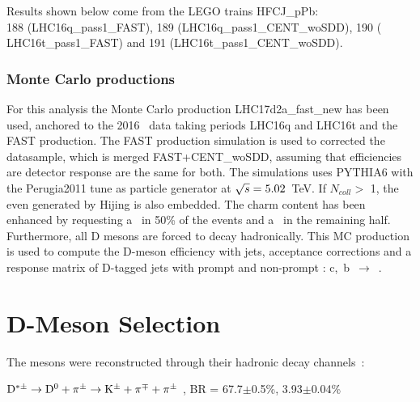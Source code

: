 Results shown below come from the LEGO trains HFCJ\_pPb: \\188 (LHC16q\_pass1\_FAST), 189 (LHC16q\_pass1\_CENT\_woSDD), 190 ( LHC16t\_pass1\_FAST) and 191 (LHC16t\_pass1\_CENT\_woSDD).

\subsubsection{Monte Carlo productions}

For this analysis the Monte Carlo production LHC17d2a\_fast\_new has been used, anchored to the 2016 \pPb\ data taking periods LHC16q and LHC16t and the FAST production. The FAST production simulation is used to corrected the datasample, which is merged FAST+CENT\_woSDD, assuming that efficiencies are detector response are the same for both.
The simulations uses PYTHIA6 with the Perugia2011 tune as particle generator at $\sqrt{s}=5.02$~TeV. If $N_{coll} > $ 1, the even generated by Hijing is also embedded.
The charm content has been enhanced by requesting a \ccbar\ in 50\% of the events and a \bbbar\ in the remaining half.
Furthermore, all D mesons are forced to decay hadronically.
This MC production is used to compute the D-meson efficiency with jets, acceptance corrections and a response matrix of D-tagged jets with prompt and non-prompt \Dstar: c,~b~$\rightarrow$~\Dstar.




\section{D-Meson Selection}
The \Dstar mesons were reconstructed through their hadronic decay channels~\cite{PDG:2016}:

\begin{center}
$\mathrm{D^{*\pm}} \to \mathrm{D^{0}} + \pi^{\pm} \to {\rm K}^{\pm} + \pi^{\mp}  + \pi^{\pm}$ , BR = 67.7$\pm$0.5\%, 3.93$\pm$0.04\%
\end{center}

